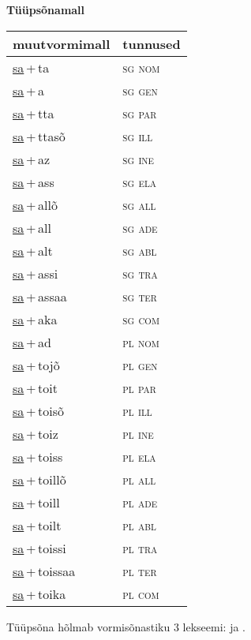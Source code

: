 
\vspace{1.8em}
\begin{minipage}{\textwidth}
\textbf{Tüüpsõnamall \,}\\

\begin{sideways}
\begin{tabular}{l l}
muutvormimall & tunnused \\
\hline
\underline{sa}\,+\,ta & \textsc{ sg nom } \\
\underline{sa}\,+\,a & \textsc{ sg gen } \\
\underline{sa}\,+\,tta & \textsc{ sg par } \\
\underline{sa}\,+\,ttasõ & \textsc{ sg ill } \\
\underline{sa}\,+\,az & \textsc{ sg ine } \\
\underline{sa}\,+\,ass & \textsc{ sg ela } \\
\underline{sa}\,+\,allõ & \textsc{ sg all } \\
\underline{sa}\,+\,all & \textsc{ sg ade } \\
\underline{sa}\,+\,alt & \textsc{ sg abl } \\
\underline{sa}\,+\,assi & \textsc{ sg tra } \\
\underline{sa}\,+\,assaa & \textsc{ sg ter } \\
\underline{sa}\,+\,aka & \textsc{ sg com } \\
\underline{sa}\,+\,ad & \textsc{ pl nom } \\
\underline{sa}\,+\,tojõ & \textsc{ pl gen } \\
\underline{sa}\,+\,toit & \textsc{ pl par } \\
\underline{sa}\,+\,toisõ & \textsc{ pl ill } \\
\underline{sa}\,+\,toiz & \textsc{ pl ine } \\
\underline{sa}\,+\,toiss & \textsc{ pl ela } \\
\underline{sa}\,+\,toillõ & \textsc{ pl all } \\
\underline{sa}\,+\,toill & \textsc{ pl ade } \\
\underline{sa}\,+\,toilt & \textsc{ pl abl } \\
\underline{sa}\,+\,toissi & \textsc{ pl tra } \\
\underline{sa}\,+\,toissaa & \textsc{ pl ter } \\
\underline{sa}\,+\,toika & \textsc{ pl com } \\
\end{tabular}
\end{sideways}
\label{tab:tüüpsõnamall-sata}

\end{minipage}

 
\vspace{1em}
\noindent Tüüpsõna hõlmab vormisõnastiku 3 lekseemi:  ja .
